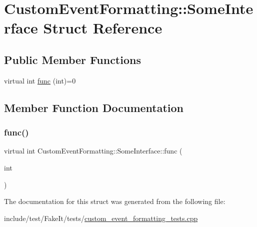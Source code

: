 \hypertarget{structCustomEventFormatting_1_1SomeInterface}{}\section{Custom\+Event\+Formatting\+::Some\+Interface Struct Reference}
\label{structCustomEventFormatting_1_1SomeInterface}
\subsection*{Public Member Functions}
\begin{DoxyCompactItemize}
\item 
virtual int \mbox{\hyperlink{structCustomEventFormatting_1_1SomeInterface_a197c83805967c78aa72b18ac41da2ddc}{func}} (int)=0
\end{DoxyCompactItemize}


\subsection{Member Function Documentation}
\mbox{\label{structCustomEventFormatting_1_1SomeInterface_a197c83805967c78aa72b18ac41da2ddc}} 
\subsubsection{\texorpdfstring{func()}{func()}}
{\footnotesize\ttfamily virtual int Custom\+Event\+Formatting\+::\+Some\+Interface\+::func (\begin{DoxyParamCaption}\item[{int}]{ }\end{DoxyParamCaption})\hspace{0.3cm}{\ttfamily [pure virtual]}}



The documentation for this struct was generated from the following file\+:\begin{DoxyCompactItemize}
\item 
include/test/\+Fake\+It/tests/\mbox{\hyperlink{custom__event__formatting__tests_8cpp}{custom\+\_\+event\+\_\+formatting\+\_\+tests.\+cpp}}\end{DoxyCompactItemize}
